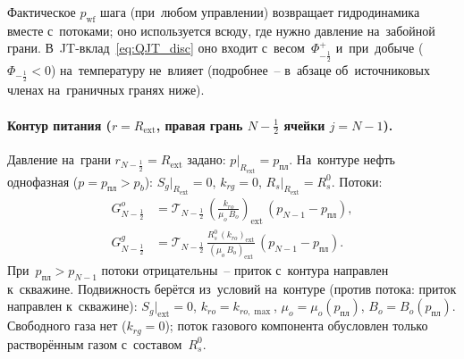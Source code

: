\documentclass[12pt,a4paper]{article}
\newcommand{\half}{\tfrac{1}{2}}
\newcommand{\Rext}{R_{\mathrm{ext}}}
\newcommand{\ppl}{p_{\text{пл}}}
\newcommand{\pwf}{p_{\mathrm{wf}}}
\newcommand{\pb}{p_b}
\begin{document}
Фактическое $\pwf$ шага (при~любом управлении) возвращает
гидродинамика вместе с~потоками; оно используется всюду, где нужно
давление на~забойной грани. В~JT-вклад~\eqref{eq:QJT_disc} оно
входит с~весом~$\Phi^{+}_{-\half}$ и~при~добыче ($\Phi_{-\half} < 0$)
на~температуру не~влияет (подробнее~-- в~абзаце об~источниковых
членах на~граничных гранях ниже).

\paragraph{Контур питания ($r = \Rext$, правая грань $N-\half$ ячейки
$j = N{-}1$).}
Давление на~грани $r_{N-\half} = \Rext$ задано:
$p\big|_{\Rext} = \ppl$. На~контуре нефть однофазная
($p = \ppl > \pb$): $S_g\big|_{\Rext} = 0$,
$k_{rg} = 0$, $R_s\big|_{\Rext} = R_s^0$. Потоки:
\begin{align}
  G_{N-\half}^{o} &= \mathcal{T}_{N-\half}\,
    \left(\frac{k_{ro}}{\mu_o\,B_o}\right)_{\!\mathrm{ext}}
    \,(p_{N-1} - \ppl),
    \label{eq:bc_flux_ext} \\
  G_{N-\half}^{g} &= \mathcal{T}_{N-\half}\,
    \frac{R_s^0\,(k_{ro})_{\mathrm{ext}}}{(\mu_o\,B_o)_{\mathrm{ext}}}
    \,(p_{N-1} - \ppl).
    \label{eq:bc_flux_ext_gas}
\end{align}
При~$\ppl > p_{N-1}$ потоки отрицательны~-- приток
с~контура направлен к~скважине.
Подвижность берётся из~условий на~контуре (против потока:
приток направлен к~скважине):
$S_g\big|_{\mathrm{ext}} = 0$, $k_{ro} = k_{ro,\max}$,
$\mu_o = \mu_o(\ppl)$, $B_o = B_o(\ppl)$.
Свободного газа нет ($k_{rg}=0$); поток газового компонента
обусловлен только растворённым газом с~составом~$R_s^0$.
\end{document}
